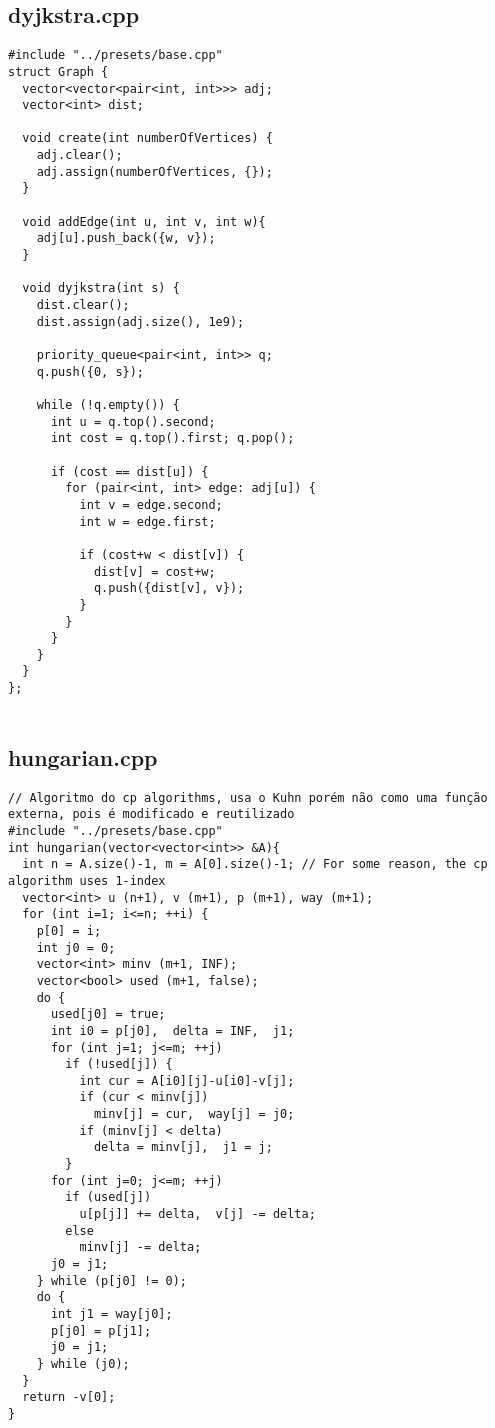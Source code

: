 \documentclass[11pt,landscape,twocolumn]{article}
\begin{document}
\subsection*{dyjkstra.cpp}
\begin{lstlisting}
#include "../presets/base.cpp"
struct Graph {
  vector<vector<pair<int, int>>> adj;
  vector<int> dist;

  void create(int numberOfVertices) {
    adj.clear();
    adj.assign(numberOfVertices, {});
  }

  void addEdge(int u, int v, int w){
    adj[u].push_back({w, v});
  }

  void dyjkstra(int s) {
    dist.clear();
    dist.assign(adj.size(), 1e9);
    
    priority_queue<pair<int, int>> q;
    q.push({0, s});

    while (!q.empty()) {
      int u = q.top().second;
      int cost = q.top().first; q.pop();

      if (cost == dist[u]) {
        for (pair<int, int> edge: adj[u]) {
          int v = edge.second;
          int w = edge.first;

          if (cost+w < dist[v]) {
            dist[v] = cost+w;
            q.push({dist[v], v});
          }
        }
      }
    }
  }
};
 
\end{lstlisting}

\subsection*{hungarian.cpp}
\begin{lstlisting}
// Algoritmo do cp algorithms, usa o Kuhn porém não como uma função externa, pois é modificado e reutilizado
#include "../presets/base.cpp"
int hungarian(vector<vector<int>> &A){
  int n = A.size()-1, m = A[0].size()-1; // For some reason, the cp algorithm uses 1-index
  vector<int> u (n+1), v (m+1), p (m+1), way (m+1);
  for (int i=1; i<=n; ++i) {
    p[0] = i;
    int j0 = 0;
    vector<int> minv (m+1, INF);
    vector<bool> used (m+1, false);
    do {
      used[j0] = true;
      int i0 = p[j0],  delta = INF,  j1;
      for (int j=1; j<=m; ++j)
        if (!used[j]) {
          int cur = A[i0][j]-u[i0]-v[j];
          if (cur < minv[j])
            minv[j] = cur,  way[j] = j0;
          if (minv[j] < delta)
            delta = minv[j],  j1 = j;
        }
      for (int j=0; j<=m; ++j)
        if (used[j])
          u[p[j]] += delta,  v[j] -= delta;
        else
          minv[j] -= delta;
      j0 = j1;
    } while (p[j0] != 0);
    do {
      int j1 = way[j0];
      p[j0] = p[j1];
      j0 = j1;
    } while (j0);
  }
  return -v[0];
}
\end{lstlisting}
\end{document}
